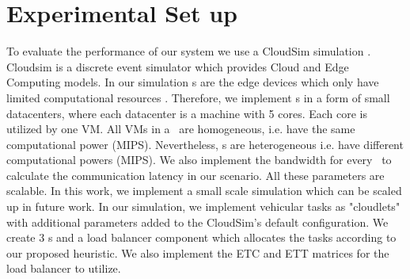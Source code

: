 \section{Experimental Set up}\label{sec:simulation}
To evaluate the performance of our system we use a CloudSim simulation \cite{calheiros2011}. Cloudsim is a discrete event simulator which provides Cloud and Edge Computing models.  
In our simulation \bs s are the edge devices which only have limited computational resources \cite{li2017resource}. Therefore, we implement \bs s in a form of small datacenters, where each datacenter is a machine with 5 cores. Each core is utilized by one VM. All VMs in a  \bs~are homogeneous, i.e. have the same computational power (MIPS). Nevertheless, \bs s are heterogeneous i.e. have different computational powers (MIPS). We also implement the bandwidth for every \bs~to calculate the communication latency in our scenario. All these parameters are scalable. In this work, we implement a small scale simulation which can be scaled up in future work. 
In our simulation, we implement vehicular tasks as "cloudlets" with additional parameters added to the CloudSim's default configuration. We create 3 \bs s and a load balancer component which allocates the tasks according to our proposed heuristic. We also implement the ETC and ETT matrices for the load balancer to utilize.


